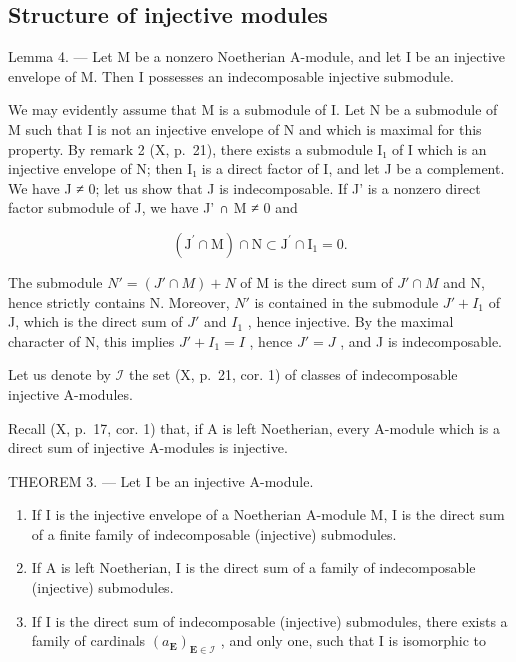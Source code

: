 \subsection{Structure of injective modules}

Lemma 4. --- Let M be a nonzero Noetherian A-module, and let I be an injective envelope of M. Then I possesses an indecomposable injective submodule.

We may evidently assume that M is a submodule of I. Let N be a submodule of M such that I is not an injective envelope of N and which is maximal for this property. By remark 2 (X, p.~21), there exists a submodule I₁ of I which is an injective envelope of N; then I₁ is a direct factor of I, and let J be a complement. We have J ≠ 0; let us show that J is indecomposable. If J' is a nonzero direct factor submodule of J, we have J' ∩ M ≠ 0 and

\[
\left(\mathrm{J} ^ {\prime} \cap \mathrm{M}\right) \cap \mathrm{N} \subset \mathrm{J} ^ {\prime} \cap \mathrm{I} _ {1} = 0.
\]

The submodule \(N' = (J' \cap M) + N\) of M is the direct sum of \(J' \cap M\) and N, hence strictly contains N. Moreover, \(N'\) is contained in the submodule \(J' + I_{1}\) of J, which is the direct sum of \(J'\) and \(I_{1}\) , hence injective. By the maximal character of N, this implies \(J' + I_{1} = I\) , hence \(J' = J\) , and J is indecomposable.

Let us denote by \(\mathcal{I}\) the set (X, p.~21, cor. 1) of classes of indecomposable injective A-modules.

Recall (X, p.~17, cor. 1) that, if A is left Noetherian, every A-module which is a direct sum of injective A-modules is injective.

THEOREM 3. --- Let I be an injective A-module.

\begin{enumerate}
\def\labelenumi{\alph{enumi})}
\item
  If I is the injective envelope of a Noetherian A-module M, I is the direct sum of a finite family of indecomposable (injective) submodules.
\item
  If A is left Noetherian, I is the direct sum of a family of indecomposable (injective) submodules.
\item
  If I is the direct sum of indecomposable (injective) submodules, there exists a family of cardinals \((a_{\mathbf{E}})_{\mathbf{E}\in\mathcal{I}}\) , and only one, such that I is isomorphic to
\end{enumerate}

